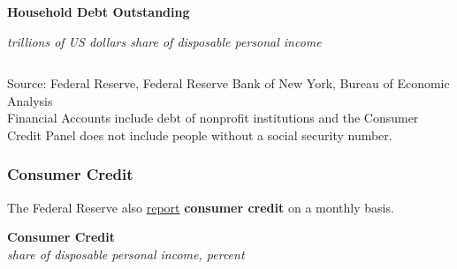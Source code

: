 \documentclass{report}
\makeatletter
\newcommand*\short[1]{\expandafter\@gobbletwo\number\numexpr#1\relax}
\newcommand{\absnode}[3]{\node[below right, align=left] at (axis cs: #1,#2) {#3};}
\newcommand{\dateaxisticks}{
		date coordinates in=x, axis line style={draw=none},
		xmax={2024-01-31},
		max space between ticks=40,	    
		xtick={{1990-01-01}, {1992-01-01}, {1994-01-01}, 
			{1996-01-01}, {1998-01-01}, {2000-01-01}, 
			{2002-01-01}, {2004-01-01}, {2006-01-01},
			{2008-01-01}, {2010-01-01}, {2012-01-01}, {2014-01-01},
		    {2016-01-01}, {2018-01-01}, {2020-01-01}, {2022-01-01}, 
		    {2024-01-01}, {2026-01-01}},
		minor xtick={{1989-01-01}, {1991-01-01}, {1993-01-01},
			{1995-01-01}, {1997-01-01}, {1999-01-01}, 
			{2001-01-01}, {2003-01-01}, {2005-01-01}, {2007-01-01},
		    {2009-01-01}, {2011-01-01}, {2013-01-01}, {2015-01-01},
		    {2017-01-01}, {2019-01-01}, {2021-01-01}, {2023-01-01}, 
		    {2025-01-01}, {2027-01-01}},
		enlarge y limits={0.06}, enlarge x limits={0.01},
		xticklabel style={align=center, yshift=-2pt}, tick label style={inner sep=0pt},
		}
\newcommand{\bbar}[2]{extra #1 ticks = {{#2}}, extra #1 tick labels = ,
		extra #1 tick style = {grid=major, grid style={thick, black!25}},}
\newcommand{\stdline}[4]{\addplot[very thick, no markers, color=#1] 
		table [x=#2, y=#3, col sep=comma] {#4};	}
\newcommand{\thickline}[4]{\addplot[ultra thick, no markers, color=#1] 
		table [x=#2, y=#3, col sep=comma] {#4};	}
\newcommand{\rbars}{
		\fill[color=black!10] (axis cs:{1990-07-01},\pgfkeysvalueof{/pgfplots/ymin})
			rectangle (axis cs:{1991-03-01}, \pgfkeysvalueof{/pgfplots/ymax});
		\fill[color=black!10] (axis cs:{2007-12-01},\pgfkeysvalueof{/pgfplots/ymin})
			rectangle (axis cs:{2009-07-01}, \pgfkeysvalueof{/pgfplots/ymax});
		\fill[color=black!10] (axis cs:{2001-03-01},\pgfkeysvalueof{/pgfplots/ymin})
			rectangle (axis cs:{2001-11-01}, \pgfkeysvalueof{/pgfplots/ymax});
		\fill[color=black!10] (axis cs:{2020-02-01},\pgfkeysvalueof{/pgfplots/ymin})
			rectangle (axis cs:{2020-05-01}, \pgfkeysvalueof{/pgfplots/ymax});}
\makeatother
\begin{document}
{\begin{minipage}{1.0\textwidth}
\normalsize \textbf{Household Debt Outstanding}\\
\footnotesize{\textit{trillions of US dollars \hspace{46mm} share of disposable personal income}\\
 \setlength{\tabcolsep}{3.1pt} \color{black!90}
	{\renewcommand{\arraystretch}{1.5}
		 \begin{tabular}{p{36mm} R{11.8mm} R{11.8mm}  R{8.0mm} R{7.4mm} R{7.4mm} 
		   R{7.4mm} R{7.4mm}}
			  \hline
		\end{tabular}
	}}\vspace{-1mm}

\footnotesize{Source: Federal Reserve, Federal Reserve Bank of New York, Bureau of Economic Analysis}\\
\footnotesize{Financial Accounts include debt of nonprofit institutions and the Consumer Credit Panel does not include people without a social security number.}
\end{minipage}
\newpage
\vspace*{-10mm}

\begin{minipage}{1.0\textwidth}  
\subsubsection*{Consumer Credit}

\small The Federal Reserve also \href{https://www.federalreserve.gov/releases/g19/current/default.htm}{report} \textbf{consumer credit} on a monthly basis. 



\normalsize \textbf{Consumer Credit}\\
\footnotesize{\textit{share of disposable personal income, percent}}
\vspace{3.3cm}

\hspace{3mm} 


\end{minipage}}
\end{document}
